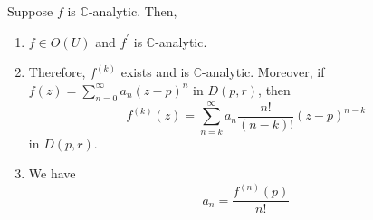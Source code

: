 	\begin{theorem}
	  \label{thm:analytic-functions-are-infinitely-differentiable}
		Suppose $f$ is $\mathbb{C}$-analytic. Then, 
		\begin{enumerate}
			\item $f \in O(U)$ and $f^\prime$ is $\mathbb{C}$-analytic. 
			\item Therefore, $f^{(k)}$ exists and is $\mathbb{C}$-analytic. Moreover, if $f(z) = \sum_{n=0}^\infty a_n (z - p)^n$ in $D(p, r)$, then 
				\begin{equation}
					f^{(k)} (z) = \sum_{n=k}^\infty a_n \frac{n!}{(n-k)!} (z - p)^{n-k}
				\end{equation}
				in $D(p, r)$. 
			\item We have 
				\begin{equation}
					a_n = \frac{f^{(n)}(p)}{n!}
				\end{equation}
		\end{enumerate}
	\end{theorem}
